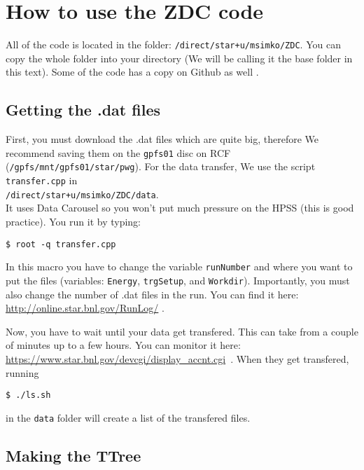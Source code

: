 \section{How to use the ZDC code}\hypertarget{how-to-use-the-zdc-code}{}\label{how-to-use-the-zdc-code}

All of the code is located in the folder: \texttt{/direct/star+u/msimko/ZDC}. You can copy the whole folder into
your directory (We will be calling it the base folder in this text). Some of the code has
a copy on Github as well \cite{ZdcGithubRepo}.

\subsection{Getting the .dat files}\hypertarget{getting-the-dat-files}{}\label{getting-the-dat-files}

First, you must download the .dat files which are quite big, therefore We recommend saving them on
the \texttt{gpfs01} disc on RCF (\texttt{/gpfs/mnt/gpfs01/star/pwg}). For the data transfer, We use the script
\texttt{transfer.cpp} in\\
\texttt{/direct/star+u/msimko/ZDC/data}.\\
It uses Data Carousel so you won't put much
pressure on the HPSS (this is good practice). You run it by typing:
\begin{verbatim}
$ root -q transfer.cpp
\end{verbatim}
In this macro you have to change the variable
\texttt{runNumber} and where you want to put the files (variables: \texttt{Energy}, \texttt{trgSetup}, 
and \texttt{Workdir}).
Importantly, you must also change the number of .dat files in the run. You can find it here:
\url{http://online.star.bnl.gov/RunLog/} \cite{runLogBrowser}.

Now, you have to wait until your data get transfered. This can take from a couple of minutes up to a few hours.
You can monitor it here:
\url{https://www.star.bnl.gov/devcgi/display_accnt.cgi}~\cite{hpss}.
When they get transfered, running
\begin{verbatim}
$ ./ls.sh
\end{verbatim}
in the \texttt{data} folder will create a list of the transfered files.

\subsection{Making the TTree}\hypertarget{making-the-ttree}{}\label{making-the-ttree}

